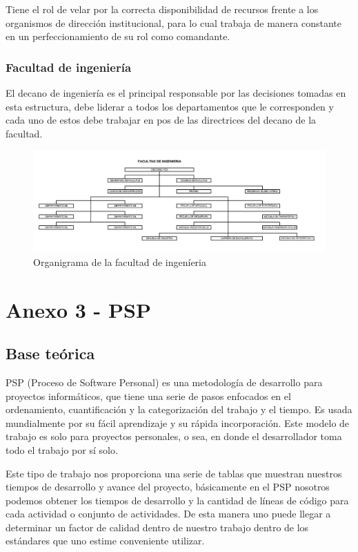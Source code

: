 \documentclass[a4paper,12pt,openany,oneside]{book}
\begin{document}
Tiene el rol de velar por la correcta disponibilidad de recursos frente a los organismos de dirección institucional, para lo cual trabaja de manera constante en un perfeccionamiento de su rol como comandante.

\subsection{Facultad de ingeniería}
El decano de ingeniería es el principal responsable por las decisiones tomadas en esta estructura, debe liderar a todos los departamentos que le corresponden y cada uno de estos debe trabajar en pos de las directrices del decano de la facultad.
\begin{figure}[!hbp]
\begin{center}
\includegraphics[scale=0.45,angle=0]{images/organigrama/11.png}
\caption{Organigrama de la facultad de ingen\'ieria}
\label{Organigrama de la facultad de ingenieria}
\end{center}
\end{figure}
\chapter{Anexo 3 - PSP}
\thispagestyle{empty}
\section{Base teórica}
PSP (Proceso de Software Personal) es una metodología de desarrollo para proyectos informáticos, que tiene una serie de pasos enfocados en el ordenamiento, cuantificación y la categorización del trabajo y el tiempo. Es usada mundialmente por su fácil aprendizaje y su rápida incorporación. Este modelo de trabajo es solo para proyectos personales, o sea, en donde el desarrollador toma todo el trabajo por sí solo.

Este tipo de trabajo nos proporciona una serie de tablas que muestran nuestros tiempos de desarrollo y avance del proyecto, básicamente en el PSP nosotros podemos obtener los tiempos de desarrollo y la cantidad de líneas de código para cada actividad o conjunto de actividades. De esta manera uno puede llegar a determinar un factor de calidad dentro de nuestro trabajo dentro de los estándares que uno estime conveniente utilizar.
\end{document}

